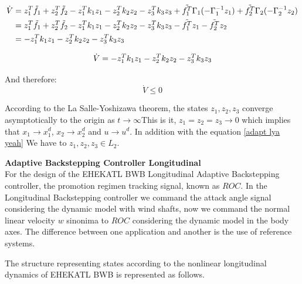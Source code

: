 \begin{align}
      \dot V &= z^T_1 \Tilde{f_1} + z^T_2 \Tilde{f_2} - z^T_1 k_1 z_1 - z^T_2 k_2 z_2 -  z^T_3  k_3 z_3  + \Tilde{f_1^T}  \Gamma_1 (- \Gamma_{1}^{-1} z_1) + \Tilde{f_2^T} \Gamma_2 (- \Gamma_{2}^{-1} z_2) \nonumber \\ 
      &= z^T_1 \Tilde{f_1} + z^T_2 \Tilde{f_2} - z^T_1 k_1 z_1 - z^T_2 k_2 z_2 -  z^T_3  k_3 z_3  - \Tilde{f_1^T} z_1 - \Tilde{f_2^T} z_2 \nonumber \\
      &= - z^T_1 k_1 z_1 - z^T_2 k_2 z_2 -  z^T_3  k_3 z_3
\end{align}

\begin{equation}
\label{adapt lya yeah}
    \dot V = - z^T_1 k_1 z_1 - z^T_2 k_2 z_2 -  z^T_3  k_3 z_3 \\
\end{equation}

And therefore:
\begin{equation}
    \dot V \leqslant 0
\end{equation}

According to the La Salle-Yoshizawa theorem, the states $z_1,z_2,z_3$ converge asymptotically to the origin as  $t\to\infty$This is it, $z_1=z_2 = z_3 \to 0$ which implies that $x_1\to x_1^d$, $x_2\to x_2^d$ and $u\to u^d$. In addition with the equation \ref{adapt lya yeah} We have to $z_1, z_2, z_3 \in L_2$. 

\medskip

\textbf{Adaptive Backstepping Controller Longitudinal}\\
For the design of the EHEKATL BWB Longitudinal Adaptive Backstepping controller, the promotion regimen tracking signal, known as $ROC$. In the Longitudinal Backstepping controller we command the attack angle signal considering the dynamic model with wind shafts, now we command the normal linear velocity $w$ sinonima to $ROC$ considering the dynamic model in the body axes. The difference between one application and another is the use of reference systems.

The structure representing states according to the nonlinear longitudinal dynamics of EHEKATL BWB is represented as follows. 

